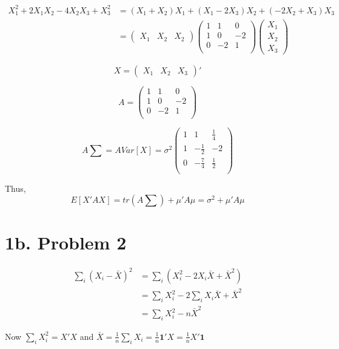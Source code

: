 \documentclass[a4paper]{article}
\begin{document}
\begin{align*}
X_1^2+2X_1X_2-4X_2X_3+X_3^2 &= (X_1+X_2)X_1 + (X_1-2X_3)X_2 + (-2X_2+X_3)X_3\\
&= \begin{pmatrix}
X_1 & X_2 & X_2
\end{pmatrix}\begin{pmatrix}
1 & 1 & 0\\
1 & 0 & -2\\
0 & -2 & 1\\
\end{pmatrix}\begin{pmatrix}
X_1\\
X_2\\
X_3
\end{pmatrix}
\end{align*}

$$X=\begin{pmatrix}X_1 & X_2 & X_3\end{pmatrix}'$$

$$A = \begin{pmatrix}
1 & 1 & 0\\
1 & 0 & -2\\
0 & -2 & 1\\
\end{pmatrix}$$


$$A\sum = AVar[X] = \sigma^2\begin{pmatrix}
1 & 1 & \frac{1}{4}\\
1 & -\frac{1}{2} & -2\\
0 & -\frac{7}{4} & \frac{1}{2}\\
\end{pmatrix}$$


Thus, $$E[X'AX] = tr(A\sum) + \mu'A\mu = \sigma^2 + \mu'A\mu$$

\section*{1b. Problem 2}

\begin{align*}
\sum_i(X_i-\bar{X})^2 &= \sum_i (X_i^2-2X_i\bar{X}+\bar{X}^2)\\ 
&= \sum_i X_i^2 -2\sum_i X_i \bar{X} + \bar{X}^2\\  
&= \sum_i X_i^2 -n\bar{X}^2
\end{align*}

Now $\sum_iX_i^2 = X'X$ and $\bar{X} = \frac{1}{n}\sum_i X_i = \frac{1}{n} \mathbf{1'}X = \frac{1}{n}X'\mathbf{1} $
\end{document}
